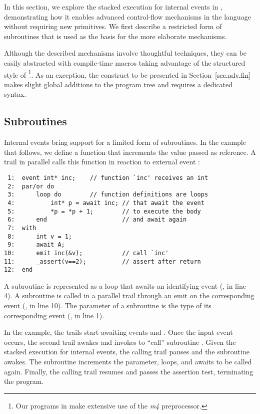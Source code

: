 In this section, we explore the stacked execution for internal events in \CEU, 
demonstrating how it enables advanced control-flow mechanisms in the language 
without requiring new primitives.
We first describe a restricted form of subroutines that is used as the basis 
for the more elaborate mechanisms.

Although the described mechanisms involve thoughtful techniques, they can be 
easily abstracted with compile-time macros taking advantage of the structured 
style of \CEU%
\footnote{Our programs in \CEU make extensive use of the \emph{m4} 
preprocessor.}.
As an exception, the \DOFIN construct to be presented in 
Section~\ref{sec.adv.fin} makes slight global additions to the program tree and 
requires a dedicated syntax.

\subsection{Subroutines}
\label{sec.adv.sub}

Internal events bring support for a limited form of subroutines.
In the example that follows, we define a function  that increments 
the value passed as reference.
A trail in parallel calls this function in reaction to external event :
 
{\small
\begin{verbatim}
 1:  event int* inc;    // function `inc' receives an int
 2:  par/or do
 3:      loop do        // function definitions are loops
 4:          int* p = await inc; // that await the event
 5:          *p = *p + 1;        // to execute the body
 6:      end                     // and await again
 7:  with
 8:      int v = 1;
 9:      await A;
10:      emit inc(&v);           // call `inc'
11:      _assert(v==2);          // assert after return
12:  end
\end{verbatim}
}

A subroutine is represented as a loop that awaits an identifying event 
(, in line 4).
A subroutine is called in a parallel trail through an emit on the corresponding 
event (, in line 10).
The parameter of a subroutine is the type of its corresponding event 
(, in line 1).

In the example, the trails start awaiting events  and .
Once the input event  occurs, the second trail awakes and invokes 
 to ``call'' subroutine .
Given the stacked execution for internal events, the calling trail pauses and 
the subroutine awakes.
The subroutine increments the parameter, loops, and awaits to be called again.
Finally, the calling trail resumes and passes the assertion test, terminating 
the program.

